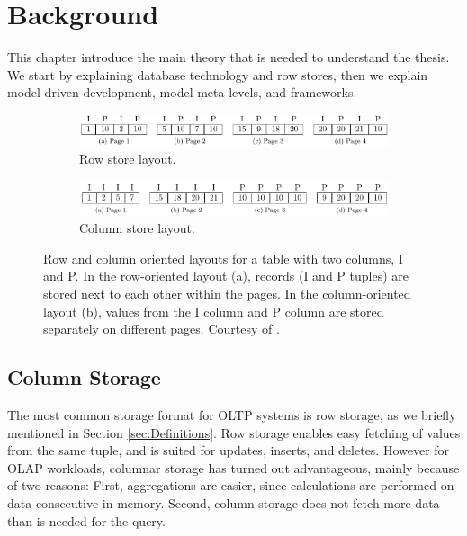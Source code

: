\chapter{Background}
\label{chap:background}

This chapter introduce the main theory that is needed to understand the thesis. We start by explaining database technology and row stores, then we explain model-driven development, model meta levels, and frameworks.

\begin{figure}
  \centering
  \begin{subfigure}{\textwidth}
    \includegraphics[width=\textwidth]{img/row-store.png}
    \caption{Row store layout.}
    \label{fig:row-column-store-1} 
  \end{subfigure}
  \begin{subfigure}{\textwidth}
    \includegraphics[width=\textwidth]{img/column-store.png}
    \caption{Column store layout.}
    \label{fig:row-column-store-2} 
  \end{subfigure}
  \caption{Row and column oriented layouts for a table with two columns, I and P. In the row-oriented layout (a), records (I and P tuples) are stored next to each other within the pages. In the column-oriented layout (b), values from the I column and P column are stored separately on different pages. Courtesy of \cite{Bjorklund2011-wh}.}
  \label{fig:row-column-store} 
\end{figure}
\section{Column Storage}
\label{sec:Column Storage}


The most common storage format for OLTP systems is row storage, as we briefly mentioned in Section \ref{sec:Definitions}. Row storage enables easy fetching of values from the same tuple, and is suited for updates, inserts, and deletes. However for OLAP workloads, columnar storage has turned out advantageous, mainly because of two reasons: First, aggregations are easier, since calculations are performed on data consecutive in memory. Second, column storage does not fetch more data than is needed for the query.

